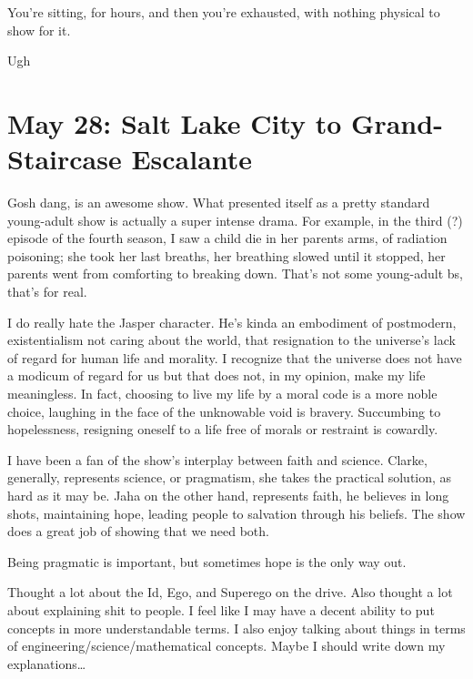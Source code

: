 \documentclass[../butidigress.tex]{subfiles}
\begin{document}
You're sitting, for hours, and then you're exhausted, with nothing physical to show for it.

\entryskip

Ugh

\section{May 28: Salt Lake City to Grand-Staircase Escalante}

Gosh dang,  is an awesome show.
What presented itself as a pretty standard young-adult show is actually a super intense drama.
For example, in the third (?) episode of the fourth season, I saw a child die in her parents arms, of radiation poisoning; she took her last breaths, her breathing slowed until it stopped, her parents went from comforting to breaking down.
That's not some young-adult bs, that's for real.

I do really hate the Jasper character.
He's kinda an embodiment of postmodern, existentialism not caring about the world, that resignation to the universe's lack of regard for human life and morality.
I recognize that the universe does not have a modicum of regard for us but that does not, in my opinion, make my life meaningless.
In fact, choosing to live my life by a moral code is a more noble choice, laughing in the face of the unknowable void is bravery.
Succumbing to hopelessness, resigning oneself to a life free of morals or restraint is cowardly.

I have been a fan of the show's interplay between faith and science.
Clarke, generally, represents science, or pragmatism, she takes the practical solution, as hard as it may be.
Jaha on the other hand, represents faith, he believes in long shots, maintaining hope, leading people to salvation through his beliefs.
The show does a great job of showing that we need both.

Being pragmatic is important, but sometimes hope is the only way out.

\entryskip


\entryskip

Thought a lot about the Id, Ego, and Superego on the drive.
Also thought a lot about explaining shit to people.
I feel like I may have a decent ability to put concepts in more understandable terms.
I also enjoy talking about things in terms of engineering/science/mathematical concepts.
Maybe I should write down my explanations\ldots
\end{document}
